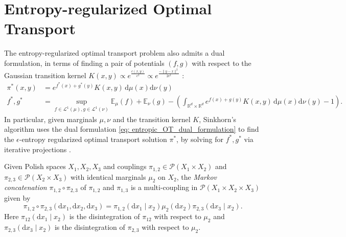 \documentclass[twoside,11pt]{article}
\newcommand{\R} {\mathbb R}
\newcommand{\E} {\mathbb{E}}
\begin{document}
\section{Entropy-regularized Optimal Transport}
\label{sec:EOT}
The entropy-regularized optimal transport problem also admits a dual formulation, in terms of finding a pair of  potentials $(f,g)$ with respect to the Gaussian transition kernel $K(x,y) \propto e^{\frac{c(x,y)}{\epsilon^2}}\propto e^{\frac{-\|y-x\|^2}{2\epsilon^2}}$ \citep{janati2021advances, nutz2021introduction}:
\begin{align}
\pi^*(x,y) &= e^{{f^*(x)+g^*(y)}}K(x,y) \, \mathrm{d}\mu(x)\mathrm{d}\nu(y)\\
f^*, g^* &= \sup_{f \in \mathcal{L}^1(\mu), g \in \mathcal{L}^1(\nu)} \E_{\mu}(f) + \E_{\nu}(g)- \left(\int_{\R^d \times \R^d} e^{f(x)+g(y)}K(x,y) \, \mathrm{d}\mu(x) \mathrm{d}\nu(y) - 1\right).
\label{eq: entropic_OT_dual_formulation}
\end{align}
In particular, given marginals $\mu,\nu$ and the transition kernel $K$, Sinkhorn's algorithm uses the dual formulation \eqref{eq: entropic_OT_dual_formulation} to find the $\epsilon$-entropy regularized optimal transport solution $\pi^*$, by solving for $f^*, g^*$ via iterative projections \citep{peyre2019computational}.


\begin{definition}
\label{def:Markov_concatenation_couplings}
Given Polish spaces $X_{1},X_{2},X_{3}$
and couplings $\pi_{1,2}\in\mathcal{P}(X_{1}\times X_{2})$ and $\pi_{2,3}\in\mathcal{P}(X_{2}\times X_{3})$
with identical marginals $\mu_{2}$ on $X_{2}$, the \emph{Markov concatenation
}$\pi_{1,2}\circ\pi_{2,3}$ of $\pi_{1,2}$ and $\pi_{1,3}$ is a multi-coupling
in $\mathcal{P}(X_{1}\times X_{2}\times X_{3})$ given by 
\[
\pi_{1,2}\circ\pi_{2,3}(\mathrm{d}x_{1},\mathrm{d}x_{2},\mathrm{d}x_{3})=\pi_{1,2}(\mathrm{d}x_{1}\mid x_{2})\mu_{2}(\mathrm{d}x_{2})\pi_{2,3}(\mathrm{d}x_{3}\mid x_{2}).
\]
Here $\pi_{12}(\mathrm{d}x_{1}\mid x_{2})$ is the disintegration of $\pi_{12}$
with respect to $\mu_{2}$ and $\pi_{2,3}(\mathrm{d}x_{3}\mid x_{2})$ is the
disintegration of $\pi_{2,3}$ with respect to $\mu_{2}$. 
\end{definition}
\end{document}
